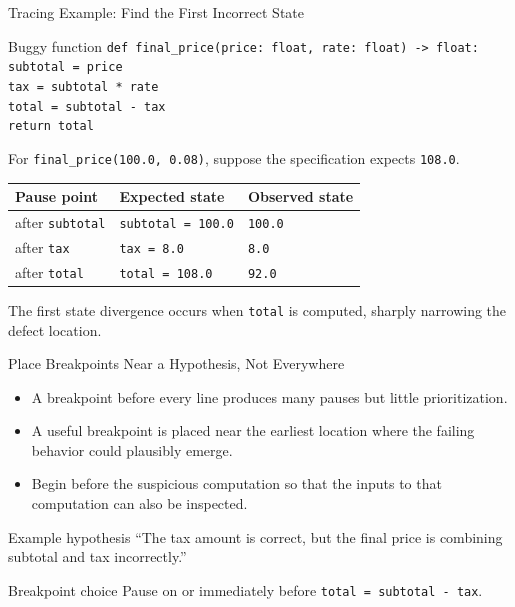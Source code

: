 \documentclass[aspectratio=169,10pt]{beamer}
\begin{document}
\begin{frame}[shrink=5]{Tracing Example: Find the First Incorrect State}
  \begin{block}{Buggy function}
    \texttt{def final\_price(price: float, rate: float) -> float:}\\
    \hspace*{0.20in}\texttt{subtotal = price}\\
    \hspace*{0.20in}\texttt{tax = subtotal * rate}\\
    \hspace*{0.20in}\texttt{total = subtotal - tax}\\
    \hspace*{0.20in}\texttt{return total}
  \end{block}

  For \texttt{final\_price(100.0, 0.08)}, suppose the specification expects \texttt{108.0}.

  \begin{center}
    \renewcommand{\arraystretch}{1.20}
    \begin{tabular}{l|l|l}
      \textbf{Pause point} & \textbf{Expected state} & \textbf{Observed state} \\\hline
      after \texttt{subtotal} & \texttt{subtotal = 100.0} & \texttt{100.0} \\
      after \texttt{tax} & \texttt{tax = 8.0} & \texttt{8.0} \\
      after \texttt{total} & \texttt{total = 108.0} & \texttt{92.0}
    \end{tabular}
  \end{center}

  \begin{keyidea}
    The first state divergence occurs when \texttt{total} is computed, sharply narrowing the defect location.
  \end{keyidea}
\end{frame}

\begin{frame}{Place Breakpoints Near a Hypothesis, Not Everywhere}
  \begin{itemize}
    \item A breakpoint before every line produces many pauses but little prioritization.
    \item A useful breakpoint is placed near the earliest location where the failing behavior could plausibly emerge.
    \item Begin before the suspicious computation so that the inputs to that computation can also be inspected.
  \end{itemize}

  \begin{block}{Example hypothesis}
    ``The tax amount is correct, but the final price is combining subtotal and tax incorrectly.''
  \end{block}

  \begin{block}{Breakpoint choice}
    Pause on or immediately before \texttt{total = subtotal - tax}.
  \end{block}
\end{frame}
\end{document}
